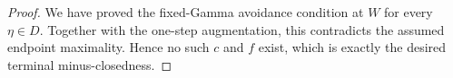 \begin{proof}
We have proved the fixed-Gamma avoidance condition at $W$ for every
$\eta\in D$.  Together with the one-step augmentation, this contradicts
the assumed endpoint maximality.  Hence no such $c$ and $f$ exist, which
is exactly the desired terminal minus-closedness.
\end{proof}
